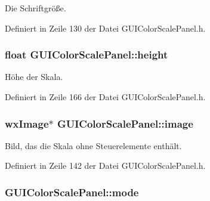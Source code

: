 Die Schriftgröße. 



Definiert in Zeile 130 der Datei G\-U\-I\-Color\-Scale\-Panel.\-h.

\hypertarget{classGUIColorScalePanel_a5bbc9ff741f566a75f757e54324dac5a}{
\subsubsection[{height}]{\setlength{\rightskip}{0pt plus 5cm}float G\-U\-I\-Color\-Scale\-Panel\-::height\hspace{0.3cm}{\ttfamily [private]}}}\label{classGUIColorScalePanel_a5bbc9ff741f566a75f757e54324dac5a}


Höhe der Skala. 



Definiert in Zeile 166 der Datei G\-U\-I\-Color\-Scale\-Panel.\-h.

\hypertarget{classGUIColorScalePanel_ac398e4b12cea263a89db6dd236ec1e87}{
\subsubsection[{image}]{\setlength{\rightskip}{0pt plus 5cm}wx\-Image$\ast$ G\-U\-I\-Color\-Scale\-Panel\-::image\hspace{0.3cm}{\ttfamily [private]}}}\label{classGUIColorScalePanel_ac398e4b12cea263a89db6dd236ec1e87}


Bild, das die Skala ohne Steuerelemente enthält. 



Definiert in Zeile 142 der Datei G\-U\-I\-Color\-Scale\-Panel.\-h.

\hypertarget{classGUIColorScalePanel_ad2f795e0d3a1c8e731da16d3320dbd34}{
\subsubsection[{mode}]{ G\-U\-I\-Color\-Scale\-Panel\-::mode\hspace{0.3cm}{\ttfamily [private]}}}\label{classGUIColorScalePanel_ad2f795e0d3a1c8e731da16d3320dbd34}


